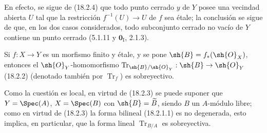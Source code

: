 En efecto, se sigue de (18.2.4) que todo punto cerrado $y$ de $Y$ posee una vecindad abierta $U$ tal que la restricción $f^{-1}(U)\to U$ de $f$ sea étale; la conclusión se sigue de que, en los dos casos considerados, todo subconjunto cerrado no vacío de $Y$ contiene un punto cerrado (5.1.11 y $\mathbf{0}_{\mathrm I}$, 2.1.3).

\begin{corollary}[18.2.6]
\label{IV.18.2.6}
Si $f:X\to Y$ es un morfismo finito y étale, y se pone $\sh{B}=f_*(\sh{O}_X)$, entonces el $\sh{O}_Y$-homomorfismo $\operatorname{Tr}_{\sh{B}/\sh{O}_Y}:\sh{B}\to\sh{O}_Y$ \textup{(18.2.2) (denotado también por $\operatorname{Tr}_f$)} es sobreyectivo.
\end{corollary}

Como la cuestión es local, en virtud de (18.2.3) se puede suponer que $Y=\Spec(A)$, $X=\Spec(B)$ con $\sh{B}=\widetilde B$, siendo $B$ un $A$-módulo libre; como en virtud de (18.2.3) la forma bilineal (18.2.1.1) es no degenerada, esto implica, en particular, que la forma lineal $\operatorname{Tr}_{B/A}$ es sobreyectiva.

